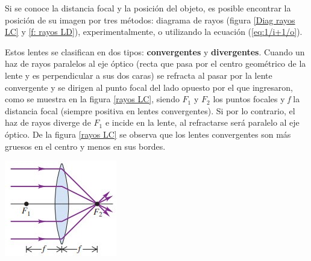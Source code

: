 \documentclass[a4paper,12pt]{article}
\newenvironment{Figure}
  {\par\medskip\noindent\minipage{\linewidth}}
  {\endminipage\par\medskip}
\begin{document}
\begin{multicols*}{2}


    Si se conoce la distancia focal y la posición del objeto, es posible encontrar la posición de su imagen por tres métodos: diagrama de rayos (figura \ref{Diag rayos LC} y \ref{f: rayos LD}), experimentalmente, o utilizando la ecuación (\ref{eq:1/i+1/o}).

    Estos lentes se clasifican en dos tipos: \textbf{convergentes} y \textbf{divergentes}. Cuando un haz de rayos paralelos al eje óptico (recta que pasa por el centro geométrico de la lente y es perpendicular a sus dos caras) se refracta al pasar por la lente convergente y se dirigen al punto focal del lado opuesto por el que ingresaron, como se muestra en la figura \ref{rayos LC}, siendo $F_{1}$ y $F_{2}$ los puntos focales y \emph{f} la distancia focal (siempre positiva en lentes convergentes). Si por lo contrario, el haz de rayos diverge de $F_{1}$ e incide en la lente, al refractarse será paralelo al eje óptico. De la figura \ref{rayos LC} se observa que los lentes convergentes son más gruesos en el centro y menos en sus bordes.

    \begin{Figure}
        \centering
        \includegraphics[width=0.65\linewidth]{LenteConvergente1.jpg}
        \label{rayos LC}
    \end{Figure}


\end{multicols*}
\end{document}
